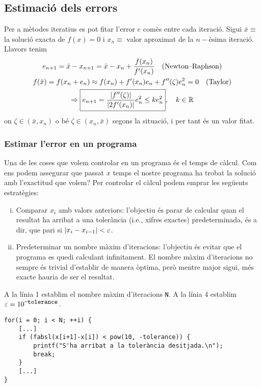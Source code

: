 \subsection{Estimació dels errors}
Per a mètodes iteratius es pot fitar l'error $e$ comès entre cada iteració. Sigui $\bar{x} \equiv$ la solució exacta de $f(x) = 0$ i $x_{n} \equiv$ valor aproximat de la $n-$èsima iteració. Llavors tenim
\begin{align*}
\begin{gathered}
    e_{n+1} = \bar{x} - x_{n+1} = \bar{x} - x_{n} + \frac{f(x_{n})}{f'(x_{n})} \quad \text{(Newton--Raphson)}\\
    f(\bar{x}) = f(x_{n} + e_{n}) \approx f(x_{n}) + f'(x_{n}) e_{n} + f''(\zeta) e_{n}^{2} = 0\quad \text{(Taylor)} \\
    \Rightarrow \boxed{e_{n+1} = \frac{\left| f''(\zeta) \right|}{\left| 2f'(x_{n}) \right|} e_{n}^{2} \leq k e_{n}^{2}}, \quad k \in \mathbb{R}
\end{gathered}
\end{align*}
on $\zeta \in (\bar{x}, x_{n})$ o bé $\zeta \in (x_{n}, \bar{x})$ segons la situació, i per tant és un valor fitat. 

\subsubsection*{Estimar l'error en un programa}
Una de les coses que volem controlar en un programa és el temps de càlcul. Com ens podem assegurar que passat $x$ temps el nostre programa ha trobat la solució amb l'exactitud que volem? Per controlar el càlcul podem emprar les següents estratègies:
\begin{enumerate}[i)]
\item Comparar $x_{i}$ amb valors anteriors: l'objectiu és parar de calcular quan el resultat ha arribat a una tolerància (i.e., xifres exactes) predeterminada, és a dir, que pari si $\left| x_{i}-x_{i-1} \right| < \varepsilon$.

\item Predeterminar un nombre màxim d'iteracions: l'objectiu és evitar que el programa es quedi calculant infinitament. El nombre màxim d'iteracions no sempre és trivial d'establir de manera òptima, però mentre major sigui, més exacte hauria de ser el resultat.
\end{enumerate}
\begin{example} A la línia 1 establim el nombre màxim d'iteracions \verb|N|. A la línia 4 establim $\varepsilon = 10^{\small{\verb|-tolerance|}}$.
\begin{Verbatim}
for(i = 0; i < N; ++i) {
    [...]
    if (fabsl(x[i+1]-x[i]) < pow(10, -tolerance)) {
        printf("S'ha arribat a la tolerància desitjada.\n");
        break;
    }
    [...]
}
\end{Verbatim}
\end{example}